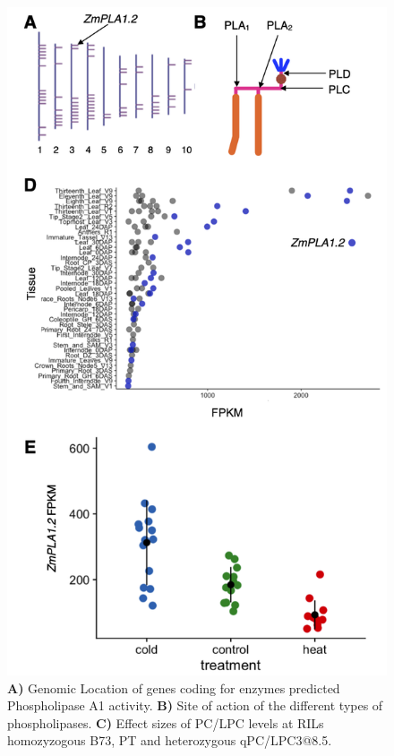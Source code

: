 \documentclass[9pt,twocolumn,twoside,lineno]{BioRxiv}
\begin{document}
\begin{figure}[t]
\begin{center}
\includegraphics[width=0.4\paperwidth]{Sup_Figures/Sup_Fig_3.png}
\caption{\textbf{A)} Genomic Location of genes coding for enzymes predicted Phospholipase A1 activity. 
\textbf{B)} Site of action of the different types of phospholipases.
\textbf{C)} Effect sizes of PC/LPC levels at RILs homozyzogous B73, PT and heterozygous qPC/LPC3@8.5.
} 
\label{SupFig3}
\end{center}
\end{figure}  
\end{document}
